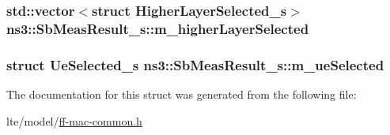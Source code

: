 \subsubsection[{\texorpdfstring{m\+\_\+higher\+Layer\+Selected}{m_higherLayerSelected}}]{\setlength{\rightskip}{0pt plus 5cm}std\+::vector$<$struct {\bf Higher\+Layer\+Selected\+\_\+s}$>$ ns3\+::\+Sb\+Meas\+Result\+\_\+s\+::m\+\_\+higher\+Layer\+Selected}\hypertarget{structns3_1_1SbMeasResult__s_a0a75139e3d23967f1826732960b1928a}{}\label{structns3_1_1SbMeasResult__s_a0a75139e3d23967f1826732960b1928a}
\subsubsection[{\texorpdfstring{m\+\_\+ue\+Selected}{m_ueSelected}}]{\setlength{\rightskip}{0pt plus 5cm}struct {\bf Ue\+Selected\+\_\+s} ns3\+::\+Sb\+Meas\+Result\+\_\+s\+::m\+\_\+ue\+Selected}\hypertarget{structns3_1_1SbMeasResult__s_a7d5fff638d046728b909d37bf5d1ec3d}{}\label{structns3_1_1SbMeasResult__s_a7d5fff638d046728b909d37bf5d1ec3d}


The documentation for this struct was generated from the following file\+:\begin{DoxyCompactItemize}
\item 
lte/model/\hyperlink{ff-mac-common_8h}{ff-\/mac-\/common.\+h}\end{DoxyCompactItemize}
